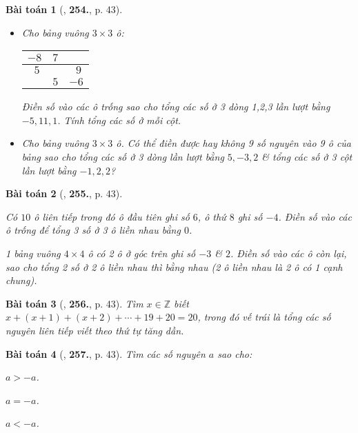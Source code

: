 \documentclass{article}
\numberwithin{equation}{section}
\newtheorem{baitoan}{Bài toán}
\begin{document}
\begin{baitoan}[\cite{Binh_Toan_6_tap_1}, \textbf{254.}, p. 43]
	\begin{itemize}
		\item[(a)] Cho bảng vuông $3\times 3$ ô:
		\begin{table}[H]
			\centering
			\begin{tabular}{|c|c|c|}
				\hline
				$-8$ & $7$ &  \\
				\hline
				$\ \ 5$ &  & $\ \ 9$ \\
				\hline
				& $5$ & $-6$ \\
				\hline
			\end{tabular}
		\end{table}
		Điền số vào các ô trống sao cho tổng các số ở 3 dòng 1,2,3 lần lượt bằng $-5,11,1$. Tính tổng các số ở mỗi cột.
		\item[(b)] Cho bảng vuông $3\times 3$ ô. Có thể điền được hay không 9 số nguyên vào 9 ô của bảng sao cho tổng các số ở 3 dòng lần lượt bằng $5,-3,2$ \& tổng các số ở 3 cột lần lượt bằng $-1,2,2$?
	\end{itemize}
\end{baitoan}

\begin{baitoan}[\cite{Binh_Toan_6_tap_1}, \textbf{255.}, p. 43]
	\begin{enumerate*}
		\item[(a)] Có $10$ ô liên tiếp trong đó ô đầu tiên ghi số $6$, ô thứ $8$ ghi số $-4$. Điền số vào các ô trống để tổng 3 số ở 3 ô liền nhau bằng $0$.
		\item[(b)] 1 bảng vuông $4\times 4$ ô có 2 ô ở góc trên ghi số $-3$ \& $2$. Điền số vào các ô còn lại, sao cho tổng 2 số ở 2 ô liền nhau thì bằng nhau (2 ô liền nhau là 2 ô có 1 cạnh chung).
	\end{enumerate*}
\end{baitoan}

\begin{baitoan}[\cite{Binh_Toan_6_tap_1}, \textbf{256.}, p. 43]
	Tìm $x\in\mathbb{Z}$ biết $x + (x + 1) + (x + 2) + \cdots + 19 + 20 = 20$, trong đó vế trái là tổng các số nguyên liên tiếp viết theo thứ tự tăng dần.
\end{baitoan}

\begin{baitoan}[\cite{Binh_Toan_6_tap_1}, \textbf{257.}, p. 43]
	Tìm các số nguyên $a$ sao cho:
	\begin{enumerate*}
		\item[(a)] $a > -a$.
		\item[(b)] $a = -a$.
		\item[(c)] $a < -a$.
	\end{enumerate*}
\end{baitoan}
\end{document}
